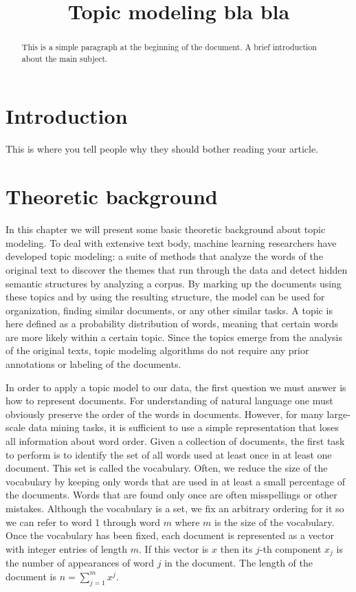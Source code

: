 \documentclass[12pt]{report}
\title{Topic modeling bla bla}
\begin{document}
\maketitle
\tableofcontents


\begin{abstract}
This is a simple paragraph at the beginning of the 
document. 
A brief introduction about the main subject.
\end{abstract}


\section{Introduction}
This is where you tell people why they should bother reading your article.


\section{Theoretic background}

In this chapter we will present some basic theoretic background about topic modeling. 
To deal with extensive text body, machine learning researchers have developed topic 
modeling: a suite of methods that analyze the words of the original text to discover 
the themes that run through the data and detect hidden semantic structures by 
analyzing a corpus. By marking up the documents using these topics and by using the  resulting structure, the model can be used for organization, finding similar 
documents, or any other similar tasks. A topic is here defined as a probability 
distribution of words, meaning that certain words are more likely within a certain 
topic. Since the topics emerge from the analysis of the original texts, topic 
modeling algorithms do not require any prior annotations or labeling of the documents.

In order to apply a topic model to our data, the first question we must answer is 
how to represent documents. For understanding of natural language one must 
obviously preserve the order of the words in documents. However, for many 
large-scale data mining tasks, it is sufficient to use a simple representation that 
loses all information about word order. Given a collection of documents, the first 
task to perform is to identify the set of all words used at least once in at least 
one document. This set is called the vocabulary. Often, we reduce the size of the 
vocabulary by keeping only words that are used in at least a small percentage of 
the documents. Words that are found only once are often misspellings or other 
mistakes. Although the vocabulary is a set, we fix an arbitrary ordering for it 
so we can refer to word 1 through word $m$ where $m$ is the size of the vocabulary. 
Once the vocabulary has been fixed, each document is represented as a vector with integer entries of length $m$. If this vector is $x$ then its $j$-th component 
$x_j$ is the number of appearances of word $j$ in the document. The length of the 
document is $n=\sum\limits_{j=1}^m x^j$.
\end{document}
